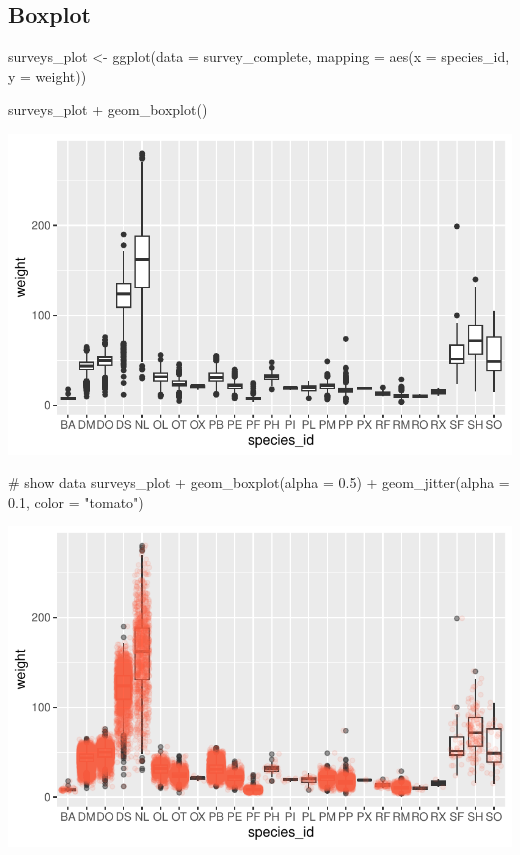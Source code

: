 \documentclass[
  letterpaper,
  DIV=11,
  numbers=noendperiod]{scrreprt}
\newenvironment{Shaded}{\begin{snugshade}}{\end{snugshade}}
\newcommand{\AttributeTok}[1]{\textcolor[rgb]{0.40,0.45,0.13}{#1}}
\newcommand{\CommentTok}[1]{\textcolor[rgb]{0.37,0.37,0.37}{#1}}
\newcommand{\FloatTok}[1]{\textcolor[rgb]{0.68,0.00,0.00}{#1}}
\newcommand{\FunctionTok}[1]{\textcolor[rgb]{0.28,0.35,0.67}{#1}}
\newcommand{\NormalTok}[1]{\textcolor[rgb]{0.00,0.23,0.31}{#1}}
\newcommand{\OtherTok}[1]{\textcolor[rgb]{0.00,0.23,0.31}{#1}}
\newcommand{\SpecialCharTok}[1]{\textcolor[rgb]{0.37,0.37,0.37}{#1}}
\newcommand{\StringTok}[1]{\textcolor[rgb]{0.13,0.47,0.30}{#1}}
\begin{document}
\subsection{Boxplot}\label{boxplot}

\begin{Shaded}
\begin{Highlighting}[]
\NormalTok{surveys\_plot }\OtherTok{\textless{}{-}} \FunctionTok{ggplot}\NormalTok{(}\AttributeTok{data =}\NormalTok{ survey\_complete, }
    \AttributeTok{mapping =} \FunctionTok{aes}\NormalTok{(}\AttributeTok{x =}\NormalTok{ species\_id, }\AttributeTok{y =}\NormalTok{ weight))}

\NormalTok{surveys\_plot }\SpecialCharTok{+} \FunctionTok{geom\_boxplot}\NormalTok{()}
\end{Highlighting}
\end{Shaded}

\includegraphics{src/notebooks/r_files/figure-pdf/unnamed-chunk-44-1.pdf}

\begin{Shaded}
\begin{Highlighting}[]
\CommentTok{\# show data}
\NormalTok{surveys\_plot }\SpecialCharTok{+} \FunctionTok{geom\_boxplot}\NormalTok{(}\AttributeTok{alpha =} \FloatTok{0.5}\NormalTok{) }\SpecialCharTok{+} 
    \FunctionTok{geom\_jitter}\NormalTok{(}\AttributeTok{alpha =} \FloatTok{0.1}\NormalTok{, }\AttributeTok{color =} \StringTok{"tomato"}\NormalTok{)}
\end{Highlighting}
\end{Shaded}

\includegraphics{src/notebooks/r_files/figure-pdf/unnamed-chunk-44-2.pdf}
\end{document}
